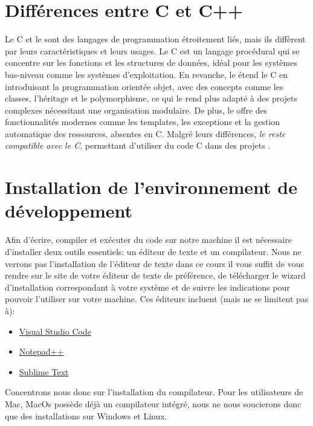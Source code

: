 \section{Différences entre C et C++}
Le C et le \cpp sont des langages de programmation étroitement liés, mais ils diffèrent par leurs caractéristiques et leurs usages. Le C est un langage procédural qui se concentre sur les fonctions et les structures de données, idéal pour les systèmes bas-niveau comme les systèmes d'exploitation. En revanche, le \cpp étend le C en introduisant la programmation orientée objet, avec des concepts comme les classes, l'héritage et le polymorphisme, ce qui le rend plus adapté à des projets complexes nécessitant une organisation modulaire. De plus, le \cpp offre des fonctionnalités modernes comme les templates, les exceptions et la gestion automatique des ressources, absentes en C. Malgré leurs différences, \emph{le \cpp reste compatible avec le C}, permettant d'utiliser du code C dans des projets \cpp.

\section{Installation de l'environnement de développement}
Afin d'écrire, compiler et exécuter du code \cpp sur notre machine il est nécessaire d'installer deux outils essentiels: un éditeur de texte et un compilateur. Nous ne verrons pas l'installation de l'éditeur de texte dans ce cours il vous suffit de vous rendre sur le site de votre éditeur de texte de préférence, de télécharger le wizard d'installation correspondant à votre système et de suivre les indications pour pouvoir l'utiliser sur votre machine. Ces éditeurs incluent (mais ne se limitent pas à):

\begin{itemize}
	\item \href{https://code.visualstudio.com/Download}{Visual Studio Code}
	\item \href{https://notepad-plus-plus.org/downloads/v8.7.4/}{Notepad++}
	\item \href{https://www.sublimetext.com/download}{Sublime Text}
\end{itemize}

Concentrons nous donc sur l'installation du compilateur. Pour les utilisateurs de Mac, MacOs possède déjà un compilateur intégré, nous ne nous soucierons donc que des installations sur Windows et Linux.

